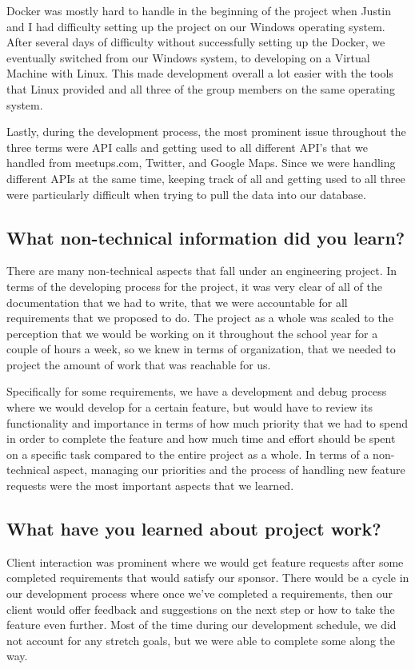 \documentclass[draftclsnofoot,10pt,onecolumn]{IEEEtran} %
\begin{document}
Docker was mostly hard to handle in the beginning of the project when Justin and
I had difficulty setting up the project on our Windows operating system. After
several days of difficulty without successfully setting up the Docker, we
eventually switched from our Windows system, to developing on a Virtual Machine
with Linux. This made development overall a lot easier with the tools that Linux
provided and all three of the group members on the same operating system.

Lastly, during the development process, the most prominent issue throughout the
three terms were API calls and getting used to all different API’s that we
handled from meetups.com, Twitter, and Google Maps. Since we were handling
different APIs at the same time, keeping track of all and getting used to all
three were particularly difficult when trying to pull the data into our
database.

\subsection{What non-technical information did you learn?}
There are many non-technical aspects that fall under an engineering project. In
terms of the developing process for the project, it was very clear of all of the
documentation that we had to write, that we were accountable for all
requirements that we proposed to do. The project as a whole was scaled to the
perception that we would be working on it throughout the school year for a
couple of hours a week, so we knew in terms of organization, that we needed to
project the amount of work that was reachable for us. 

Specifically for some requirements, we have a development and debug process
where we would develop for a certain feature, but would have to review its
functionality and importance in terms of how much priority that we had to spend
in order to complete the feature and how much time and effort should be spent on
a specific task compared to the entire project as a whole. In terms of a
non-technical aspect, managing our priorities and the process of handling new
feature requests were the most important aspects that we learned.

\subsection{What have you learned about project work?}
Client interaction was prominent where we would get feature requests after some
completed requirements that would satisfy our sponsor. There would be a cycle in
our development process where once we’ve completed a requirements, then our
client would offer feedback and suggestions on the next step or how to take the
feature even further. Most of the time during our development schedule, we did
not account for any stretch goals, but we were able to complete some along the
way.
\end{document}
